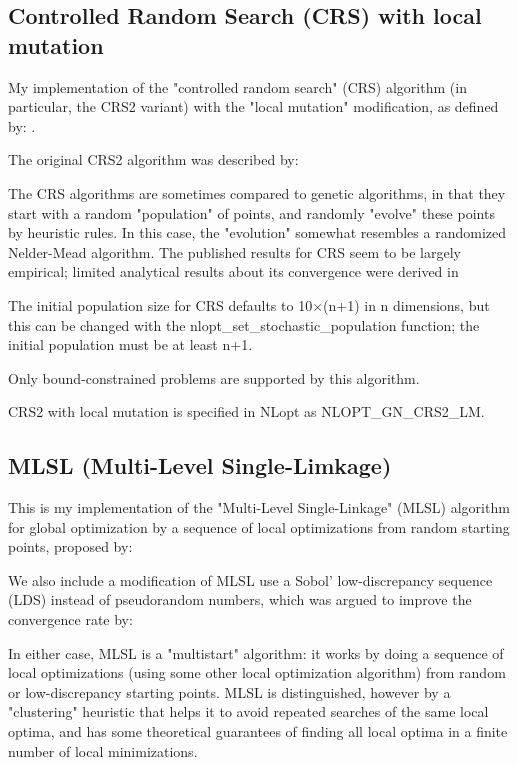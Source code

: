 \subsection{Controlled Random Search (CRS) with local mutation}
My implementation of the "controlled random search" (CRS) algorithm (in particular, the CRS2 variant) with the "local mutation" modification, as defined by: 
\cite{Kaelo_2006}. 

The original CRS2 algorithm was described by: \cite{Price_1978, Price_1983} 


The CRS algorithms are sometimes compared to genetic algorithms, in that they start with a random "population" of points, and randomly "evolve" these points by heuristic rules. In this case, the "evolution" somewhat resembles a randomized Nelder-Mead algorithm. The published results for CRS seem to be largely empirical; limited analytical results about its convergence were derived in \cite{Hendrix_2001}


The initial population size for CRS defaults to 10×(n+1) in n dimensions, but this can be changed with the nlopt\_set\_stochastic\_population function; the initial population must be at least n+1. 

Only bound-constrained problems are supported by this algorithm. 

CRS2 with local mutation is specified in NLopt as NLOPT\_GN\_CRS2\_LM. 




\subsection{MLSL (Multi-Level Single-Limkage)}
This is my implementation of the "Multi-Level Single-Linkage" (MLSL) algorithm for global optimization by a sequence of local optimizations from random starting points, proposed by: \cite{RinnooyKan_1987a, RinnooyKan_1987b}


We also include a modification of MLSL use a Sobol' low-discrepancy sequence (LDS) instead of pseudorandom numbers, which was argued to improve the convergence rate by: \cite{Kucherenko_2005}


In either case, MLSL is a "multistart" algorithm: it works by doing a sequence of local optimizations (using some other local optimization algorithm) from random or low-discrepancy starting points. MLSL is distinguished, however by a "clustering" heuristic that helps it to avoid repeated searches of the same local optima, and has some theoretical guarantees of finding all local optima in a finite number of local minimizations. 


